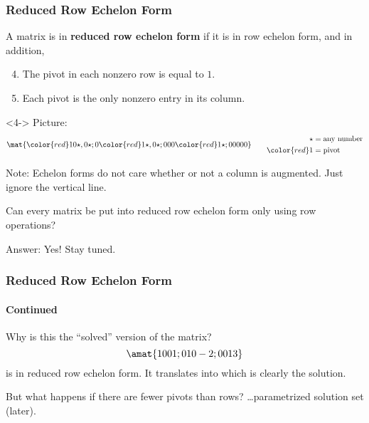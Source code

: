 
\begin{frame}
\frametitle{Reduced Row Echelon Form}

\vskip-6mm\null
\begin{bluebox}{.8\textwidth}
  A matrix is in \textbf{reduced row echelon form} if it is in row echelon form,
  and in addition,

  \pause\smallskip
  \begin{enumerate}
    \setcounter{enumi}{3}
  \item The pivot in each nonzero row is equal to $1$.
    \pause
    \item Each pivot is the only nonzero entry in its column.
  \end{enumerate}
\end{bluebox}

\begin{uncoverenv}<4->
Picture:
\[\mat{
\color{red}1   0   \star,   0   \star ;
0   \color{red}1   \star , 0   \star ;
0   0   0   \color{red}1   \star ;
0 0 0 0 0
} \qquad
\begin{aligned}
  \star &= \text{any number} \\
  \color{red}1 &= \text{pivot}
\end{aligned}\]

\pause[5]\medskip
\alert{Note:} Echelon forms do not care whether or not a column is augmented.
Just ignore the vertical line.

\pause\smallskip
\begin{ques}
  Can every matrix be put into reduced row echelon form only using row operations?
\end{ques}

\pause
\alert{Answer:} Yes!  Stay tuned.
\end{uncoverenv}

\end{frame}



\begin{frame}
\frametitle{Reduced Row Echelon Form}
\framesubtitle{Continued}

\alert{Why is this the ``solved'' version of the matrix?}
\pause
\[\amat{
1  0  0  1 ;
0  1  0  -2 ;
0  0  1  3
}\]
is in reduced row echelon form.  It translates into
\webonlycmd{\[ \syseq{x = 1; y = -2; z = 3\rlap{,}} \]}\pause
which is clearly the solution.

\pause

\vfill

But what happens if there are fewer pivots than rows?
\pause \ldots parametrized solution set (later).

\end{frame}


